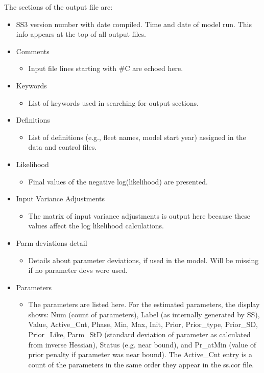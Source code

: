The sections of the output file are:
\begin{itemize}
	\item SS3 version number with date compiled.  Time and date of model run.  This info appears at the top of all output files.
	\item Comments
		\begin{itemize}
			\item 	Input file lines starting with \#C are echoed here.
		\end{itemize}
	\item Keywords
		\begin{itemize}
			\item List of keywords used in searching for output sections.
		\end{itemize}
	\item Definitions
		\begin{itemize}
			\item List of definitions (e.g., fleet names, model start year) assigned in the data and control files.
		\end{itemize}
	\item Likelihood
		\begin{itemize}
			\item Final values of the negative log(likelihood) are presented.
		\end{itemize}
	\item Input Variance Adjustments
		\begin{itemize}
			\item The matrix of input variance adjustments is output here because these values affect the log likelihood calculations.
		\end{itemize}
	\item{Parm deviations detail}
	    \begin{itemize}
		    \item Details about parameter deviations, if used in the model. Will be missing if no parameter devs were used.
		\end{itemize}
	\item Parameters
		\begin{itemize}
			\item The parameters are listed here.  For the estimated parameters, the display shows: Num (count of parameters), Label (as internally generated by SS), Value, Active\_Cnt, Phase, Min, Max, Init, Prior, Prior\_type, Prior\_SD, Prior\_Like, Parm\_StD (standard deviation of parameter as calculated from inverse Hessian), Status (e.g. near bound), and Pr\_atMin (value of prior penalty if parameter was near bound).  The Active\_Cnt entry is a count of the parameters in the same order they appear in the ss.cor file.

\end{itemize}
\end{itemize}
